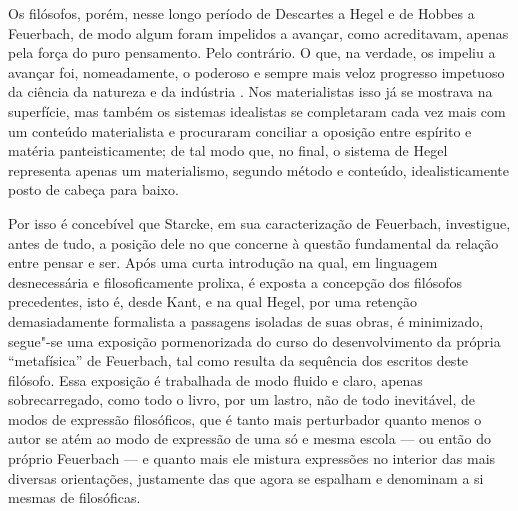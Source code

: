 Os filósofos, porém, nesse longo período
de Descartes a Hegel e de Hobbes a Feuerbach,
de modo algum foram impelidos a avançar, como acreditavam, apenas pela
força do puro pensamento. Pelo contrário. O que, na verdade, os impeliu
a avançar foi, nomeadamente, o poderoso e sempre mais veloz
progresso impetuoso da ciência da natureza \textbar{} e da indústria \textbar{}. Nos materialistas
isso já se mostrava na superfície, mas também os sistemas idealistas se
completaram cada vez mais com um conteúdo materialista e procuraram
conciliar a oposição entre espírito e matéria panteisticamente; de tal
modo que, no final, o sistema de Hegel representa apenas um materialismo, segundo método e conteúdo, idealisticamente posto de cabeça para baixo. 

Por isso é concebível que Starcke, em sua caracterização
de Feuerbach,
investigue, antes de tudo, a posição dele no que concerne à questão
fundamental da relação entre pensar e ser. Após uma curta
introdução na qual, em linguagem desnecessária e filosoficamente
prolixa, é exposta a concepção dos filósofos precedentes, isto é,
desde Kant, %
e na qual
Hegel,
por uma retenção demasiadamente formalista a passagens isoladas de suas
obras, é minimizado, segue"-se uma exposição pormenorizada do curso do
desenvolvimento da própria ``metafísica''
de Feuerbach,
tal como resulta da sequência dos escritos deste filósofo.
Essa exposição é trabalhada de modo fluido e claro, apenas
sobrecarregado, como todo o livro, por um lastro, não de
todo inevitável, de modos de expressão filosóficos, que é tanto mais
perturbador quanto menos o autor se atém ao modo de expressão de uma só
e mesma escola --- ou então do
próprio Feuerbach ---
e quanto mais ele mistura expressões no interior das mais diversas
orientações, justamente das que agora se espalham e denominam a si
mesmas de filosóficas.

